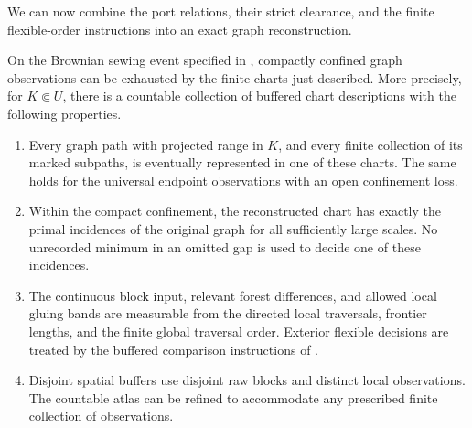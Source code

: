 We can now combine the port relations, their strict clearance, and the
finite flexible-order instructions into an exact graph reconstruction.

\begin{lemma}\label{bg:protected-atlas}
On the Brownian sewing event specified in , compactly confined graph observations can be exhausted by the finite charts just described. More precisely, for \(K\Subset U\), there is a countable collection of buffered chart descriptions with the following properties.
\begin{enumerate}[label=(\roman*)]
\item Every graph path with projected range in \(K\), and every finite collection of its marked subpaths, is eventually represented in one of these charts. The same holds for the universal endpoint observations with an open confinement loss.
\item Within the compact confinement, the reconstructed chart has exactly the primal incidences of the original graph for all sufficiently large scales. No unrecorded minimum in an omitted gap is used to decide one of these incidences.
\item The continuous block input, relevant forest differences, and allowed local gluing bands are measurable from the directed local traversals, frontier lengths, and the finite global traversal order. Exterior flexible decisions are treated by the buffered comparison instructions of .
\item Disjoint spatial buffers use disjoint raw blocks and distinct local observations. The countable atlas can be refined to accommodate any prescribed finite collection of observations.
\end{enumerate}
\end{lemma}
